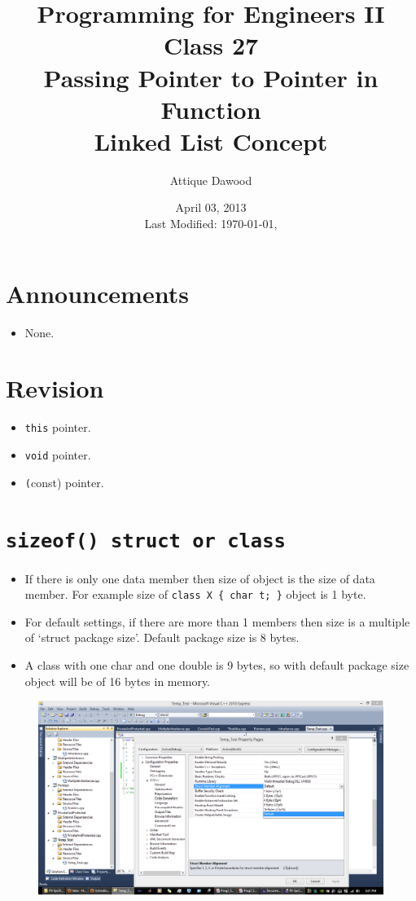 \documentclass[12pt,a4paper]{article}
\title{\vspace{-2cm}Programming for Engineers II\\Class 27\\Passing Pointer to Pointer in Function\\Linked List Concept}
\author{Attique Dawood}
\date{April 03, 2013\\[0.2cm] Last Modified: \today, \currenttime}
\begin{document}
\maketitle
\section{Announcements}
\begin{itemize}
\item None.
\end{itemize}
\section{Revision}
\begin{itemize}
\item \texttt{this} pointer.
\item \texttt{void} pointer.
\item \texttt(const) pointer.
\end{itemize}
\section{\texttt{sizeof() struct or class}}
\begin{itemize}
\item If there is only one data member then size of object is the size of data member. For example size of \verb|class X { char t; }| object is 1 byte.
\item For default settings, if there are more than 1 members then size is a multiple of `struct package size'. Default package size is 8 bytes.
\item A class with one char and one double is 9 bytes, so with default package size object will be of 16 bytes in memory.
\end{itemize}
\begin{figure}[H]
\includegraphics[width=\textwidth]{StructPackagingSize}
\end{figure}
\end{document}
